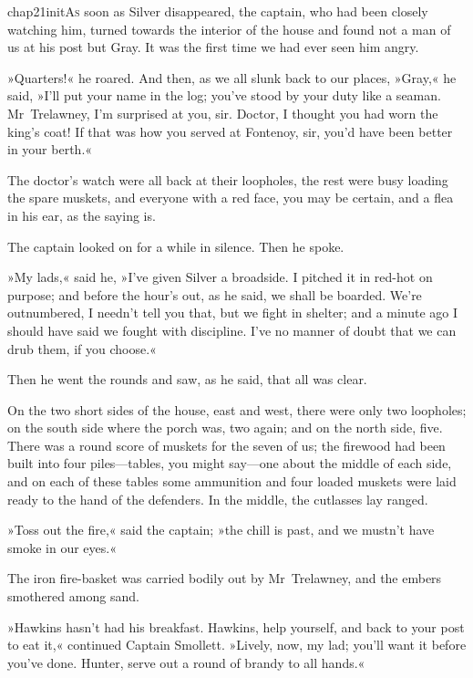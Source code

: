 
\lettrine[lines=5,image=true,findent=2pt]{chap21initA}{s} soon as Silver disappeared, the captain, who had been closely watching him, turned towards the interior of the house and found not a man of us at his post but Gray. It was the first time we had ever seen him angry.

»Quarters!« he roared. And then, as we all slunk back to our places, »Gray,« he said, »I'll put your name in the log; you've stood by your duty like a seaman. Mr~Trelawney, I'm surprised at you, sir. Doctor, I thought you had worn the king's coat! If that was how you served at Fontenoy, sir, you'd have been better in your berth.«

The doctor's watch were all back at their loopholes, the rest were busy loading the spare muskets, and everyone with a red face, you may be certain, and a flea in his ear, as the saying is.

The captain looked on for a while in silence. Then he spoke.

»My lads,« said he, »I've given Silver a broadside. I pitched it in red-hot on purpose; and before the hour's out, as he said, we shall be boarded. We're outnumbered, I needn't tell you that, but we fight in shelter; and a minute ago I should have said we fought with discipline. I've no manner of doubt that we can drub them, if you choose.«

Then he went the rounds and saw, as he said, that all was clear.

On the two short sides of the house, east and west, there were only two loopholes; on the south side where the porch was, two again; and on the north side, five. There was a round score of muskets for the seven of us; the firewood had been built into four piles—tables, you might say—one about the middle of each side, and on each of these tables some ammunition and four loaded muskets were laid ready to the hand of the defenders. In the middle, the cutlasses lay ranged.

»Toss out the fire,« said the captain; »the chill is past, and we mustn't have smoke in our eyes.«

The iron fire-basket was carried bodily out by Mr~Trelawney, and the embers smothered among sand.

»Hawkins hasn't had his breakfast. Hawkins, help yourself, and back to your post to eat it,« continued Captain Smollett. »Lively, now, my lad; you'll want it before you've done. Hunter, serve out a round of brandy to all hands.«

